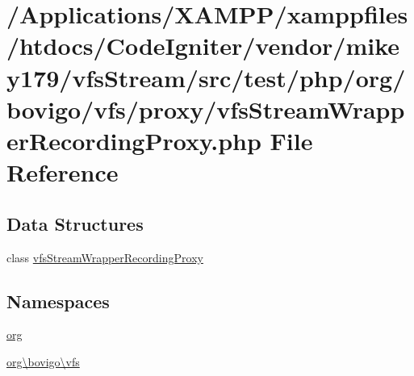 \hypertarget{vfs_stream_wrapper_recording_proxy_8php}{}\section{/\+Applications/\+X\+A\+M\+P\+P/xamppfiles/htdocs/\+Code\+Igniter/vendor/mikey179/vfs\+Stream/src/test/php/org/bovigo/vfs/proxy/vfs\+Stream\+Wrapper\+Recording\+Proxy.php File Reference}
\label{vfs_stream_wrapper_recording_proxy_8php}
\subsection*{Data Structures}
\begin{DoxyCompactItemize}
\item 
class \mbox{\hyperlink{classorg_1_1bovigo_1_1vfs_1_1vfs_stream_wrapper_recording_proxy}{vfs\+Stream\+Wrapper\+Recording\+Proxy}}
\end{DoxyCompactItemize}
\subsection*{Namespaces}
\begin{DoxyCompactItemize}
\item 
 \mbox{\hyperlink{namespaceorg}{org}}
\item 
 \mbox{\hyperlink{namespaceorg_1_1bovigo_1_1vfs}{org\textbackslash{}bovigo\textbackslash{}vfs}}
\end{DoxyCompactItemize}
